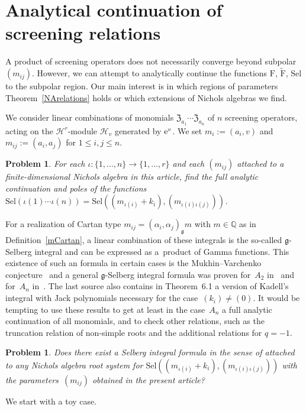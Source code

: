 \documentclass[10pt,a4paper]{amsart}
\numberwithin{equation}{section}
\newtheorem{prob}[teo]{Problem}
\newcommand{\g}{\mathfrak{g}}
\newcommand{\zem}{\mathfrak{Z}}
\newcommand{\Sel}{\mathrm{Sel}}
\newcommand{\Fp}{\mathrm{F}}
\newcommand{\rFp}{\tilde{\mathrm{F}}}
\begin{document}
\section{Analytical continuation of screening relations}\label{section4}

A product of screening operators does not necessarily converge beyond subpolar~$(m_{ij})$. However, we can attempt to analytically continue the functions $\Fp$, $\rFp$, $\Sel$ to the subpolar region. Our main interest is in which regions of parameters Theorem~\ref{NArelations} holds or which extensions of Nichols algebras we find.

We consider linear combinations of monomials $\zem_{a_1}\cdots \zem_{a_n}$ of $n$ screening operators, acting on the $\mathcal{H}^r$-module $\mathcal{H}_{v}$ generated by ${\rm e}^v$. We set $m_i := (a_i, v)$ and $m_{ij} := (a_i, a_j)$ for $1 \leq i, j \leq n$.

\begin{prob} For each $\iota\colon \{1,\dots,n\}\to\{1,\dots,r\}$ and each $(m_{ij})$ attached to a finite-dimen\-sio\-nal Nichols algebra in this article, find the full analytic continuation and poles of the functions $\Sel(\iota(1)\cdots \iota(n))= \Sel((m_{\iota(i)}+k_i),(m_{\iota(i)\iota(j)}))$.
\end{prob}
For a realization of Cartan type $m_{ij}=(\alpha_i,\alpha_j)_\g m$ with $m\in \mathbb{Q}$ as in Definition~\ref{mCartan}, a linear combination of these integrals is the so-called $\g$-Selberg integral and can be expressed as a~product of Gamma functions. This existence of such an formula in certain cases is the Mukhin--Varchenko conjecture~\cite{MV00} and a general $\g$-Selberg integral formula was proven for~$A_2$ in~\cite{TV03} and for~$A_n$ in~\cite{War09}. The last source also contains in Theorem~6.1 a version of Kadell's integral with Jack polynomials necessary for the case~$(k_i)\neq (0)$. It would be tempting to use these results to get at least in the case~$A_n$ a full analytic continuation of all monomials, and to check other relations, such as the truncation relation of non-simple roots and the additional relations for $q=-1$.
\begin{prob}
Does there exist a Selberg integral formula in the sense of {\rm \cite{MV00,TV03,War09}} attached to any Nichols algebra root system for $\Sel((m_{\iota(i)}+k_i),(m_{\iota(i)\iota(j)}))$ with the parameters~$(m_{ij})$ obtained in the present article?
\end{prob}

We start with a toy case.
\end{document}
